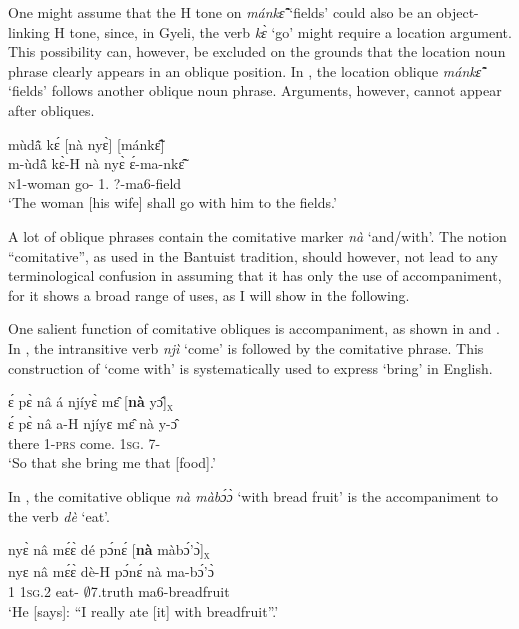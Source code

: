 One might assume that the H tone on {\itshape mánkɛ̂̃} `fields' could also be an object-linking H tone, since, in Gyeli, the verb {\itshape kɛ̀} `go' might require a location argument. This possibility can, however, be excluded on the grounds that the location noun phrase clearly appears in an oblique position. In , the location oblique {\itshape mánkɛ̃̂} `fields' follows another oblique noun phrase. Arguments, however, cannot appear after obliques.

\ea \label{Lobj2}
  \glll mùdã̂ kɛ́ [nà nyɛ̀]\textsubscript{{\OBL}} [mánkɛ̃̂]\textsubscript{{\OBL}} \\
       m-ùdã̂ kɛ̀-H {\db}nà nyɛ̀ {\db}ɛ́-ma-nkɛ̃̂ \\
         \textsc{n}1-woman go-{\R} {\db}{\COM} 1.{\OBJ}  {\db}{\LOC}?-ma6-field\\
    \trans `The woman [his wife] shall go with him to the fields.'
\z




A lot of oblique phrases contain the comitative marker {\itshape nà} `and/with'. The notion ``comitative'', as used in the Bantuist tradition, should however, not lead to any terminological confusion in assuming that it has only the use of accompaniment, for it shows a broad range of uses, as I will show in the following.

One salient function of comitative obliques is accompaniment, as shown in  and . In , the intransitive verb {\itshape njì} `come' is followed by the comitative phrase. This construction of `come with' is systematically used to express `bring' in English.

\ea \label{naACC1}
  \glll   ɛ́ pɛ̀ nâ á njíyɛ̀ mɛ̂ [{\bfseries nà} yɔ̂]\textsubscript{\textsc{x}} \\
         ɛ́ pɛ̀ nâ a-H njíyɛ mɛ̂ {\db}nà y-ɔ̂ \\
         {\LOC} there {\COMP} 1-\textsc{prs} come.{\SBJV} 1\textsc{sg}.{\OBJ} {\db}{\COM} 7-{\OBJ}  \\
    \trans `So that she bring me that [food].'
\z

\noindent In , the comitative oblique {\itshape nà màbɔ́ɔ̀} `with bread fruit' is the accompaniment to the verb {\itshape dè} `eat'.

\ea \label{naACC2}
  \glll nyɛ̀ nâ mɛ́ɛ̀ dé pɔ́nɛ́ [{\bfseries nà} màbɔ́'ɔ̀]\textsubscript{\textsc{x}} \\
        nyɛ nâ mɛ́ɛ̀ dè-H pɔ́nɛ́ {\db}nà ma-bɔ́'ɔ̀ \\
      1 {\COMP} 1\textsc{sg}.{\PST}2 eat-{\R} $\emptyset$7.truth {\db}{\COM} ma6-breadfruit\\
    \trans `He [says]: ``I really ate [it] with breadfruit''.'
\z

